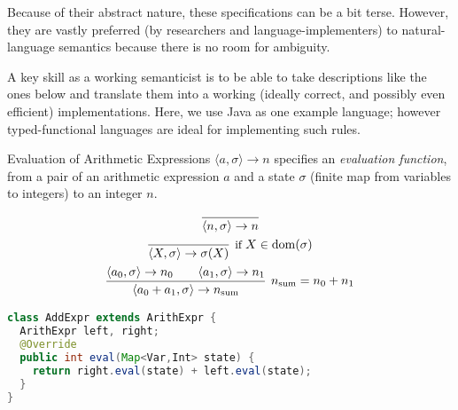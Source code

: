 Because of their abstract nature, these specifications can be a bit terse.
However, they are vastly preferred (by researchers and language-implementers)
to natural-language semantics because there is no room for ambiguity.

A key skill as a working semanticist is to be able to take descriptions like
the ones below and translate them into a working (ideally correct, and possibly
even efficient) implementations. Here, we use Java as one example language;
however typed-functional languages are ideal for implementing such rules.

\begin{frame}[fragile]{Evaluation of Arithmetic Expressions}
    $\langle a, \sigma \rangle \rightarrow n$ specifies an \emph{evaluation
    function}, from a pair of an arithmetic expression $a$ and a state
    $\sigma$ (finite map from variables to integers) to an integer $n$.
    \begin{overprint}
        \begin{gather*}
            \infer{\langle n , \sigma \rangle \rightarrow n}{} \\
            \infer[\text{\small if } X \in \mathrm{dom}(\sigma)]{\langle X , \sigma \rangle \rightarrow \sigma(X)}{} \\
            \infer[n_\mathrm{sum} = n_0 + n_1]{\langle a_0 + a_1 , \sigma \rangle \rightarrow n_\mathrm{sum}}{\langle a_0 , \sigma \rangle \rightarrow n_0 \qquad \langle a_1 , \sigma \rangle \rightarrow n_1}
        \end{gather*}
        \begin{alertenv}
        \begin{itemize}
        \end{itemize}
        \end{alertenv}
        \begin{lstlisting}[language=java]
class AddExpr extends ArithExpr {
  ArithExpr left, right;
  @Override
  public int eval(Map<Var,Int> state) {
    return right.eval(state) + left.eval(state);
  }
}
        \end{lstlisting}
    \end{overprint}
\end{frame}

